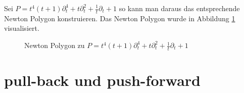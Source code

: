 \begin{exmp}
  \label{exmp:Newton-Polygon}
  \cite[Bsp 5.3. 2.]{ZulaBarbara}
  Sei $P=t^4(t+1)\partial_t^4+t\partial_t^2+\frac{1}{t}\partial_t+1$ so kann
  man daraus das entsprechende Newton Polygon konstruieren.
  Das Newton Polygon wurde in Abbildung \ref{fig:Newton-Polygon} visualisiert.
  \begin{figure}[h]
    \caption{Newton Polygon zu
      $P=t^4(t+1)\partial_t^4+t\partial_t^2+\frac{1}{t}\partial_t+1$}
    \label{fig:Newton-Polygon}
    \begin{center}
    \end{center}
  \end{figure}
\end{exmp}

\begin{comment}
  \begin{lem}
    \cite[5.1]{sabbah_cimpa90} %
    \begin{enumerate}
      \item $\cP(\cM_K)$ ist nicht Leer, wenn $\cM_K\neq\{0\}$
      \item Wenn mann eine exacte Sequenz
        $0\rightarrow{\cM'}_K\rightarrow{\cM}_K\rightarrow{\cM''}_K\rightarrow0$
        hat, so gilt $\cP(\cM_K)=\cP({\cM'}_K)\cup\cP({\cM''}_K)$.
    \end{enumerate}
  \end{lem}
\end{comment}

\section{pull-back und push-forward}
\begin{comment}
  \cite[1.3]{hotta2007d}
\end{comment}

